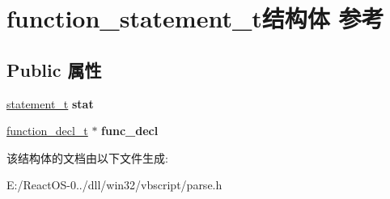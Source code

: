 \hypertarget{structfunction__statement__t}{}\section{function\+\_\+statement\+\_\+t结构体 参考}
\label{structfunction__statement__t}
\subsection*{Public 属性}
\begin{DoxyCompactItemize}
\item 
\mbox{\label{structfunction__statement__t_a4402f16d0ea944c5579c0ce3b1ddc5c7}} 
\hyperlink{struct__statement__t}{statement\+\_\+t} {\bfseries stat}
\item 
\mbox{\label{structfunction__statement__t_a19e31eca339ea5214b42ecf673b4c912}} 
\hyperlink{struct__function__decl__t}{function\+\_\+decl\+\_\+t} $\ast$ {\bfseries func\+\_\+decl}
\end{DoxyCompactItemize}


该结构体的文档由以下文件生成\+:\begin{DoxyCompactItemize}
\item 
E\+:/\+React\+O\+S-\/0../dll/win32/vbscript/parse.\+h\end{DoxyCompactItemize}
